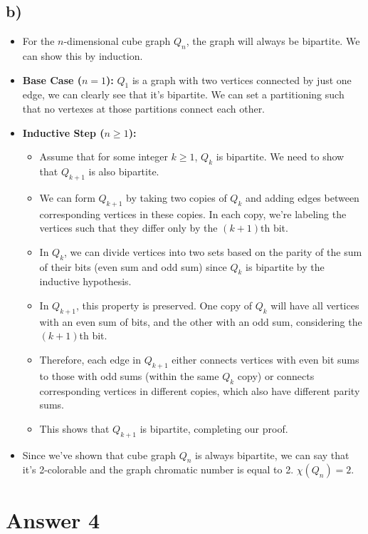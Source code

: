 \documentclass[12pt]{article}
\begin{document}
\subsection*{b)}
\begin{itemize}
	\item For the $n$-dimensional cube graph $Q_n$, the graph will always be bipartite. We can show this by induction.
	\item \textbf{Base Case ($n = 1$):} $Q_1$ is a graph with two vertices connected by just one edge, we can clearly see that it's bipartite. We can set a partitioning such that no vertexes at those partitions connect each other.
	\item \textbf{Inductive Step ($n \geq 1$):}
	\begin{itemize}
		\item Assume that for some integer $k \geq 1$, $Q_k$ is bipartite. We need to show that $Q_{k+1}$ is also bipartite.
		\item We can form $Q_{k+1}$ by taking two copies of $Q_k$ and adding edges between corresponding vertices in these copies. In each copy, we're labeling the vertices such that they differ only by the $(k+1)$th bit.
		\item In $Q_k$, we can divide vertices into two sets based on the parity of the sum of their bits (even sum and odd sum) since $Q_k$ is bipartite by the inductive hypothesis.
		\item In $Q_{k+1}$, this property is preserved. One copy of $Q_k$ will have all vertices with an even sum of bits, and the other with an odd sum, considering the $(k+1)$th bit.
		\item Therefore, each edge in $Q_{k+1}$ either connects vertices with even bit sums to those with odd sums (within the same $Q_k$ copy) or connects corresponding vertices in different copies, which also have different parity sums.
		\item This shows that $Q_{k+1}$ is bipartite, completing our proof.
	\end{itemize}
	\item Since we've shown that cube graph $Q_n$ is always bipartite, we can say that it's 2-colorable and the graph chromatic number is equal to 2. $\chi(Q_n)=2$.
\end{itemize}
\section*{Answer 4}
\end{document}
